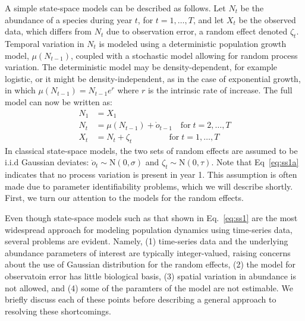 \documentclass[12pt]{article}
\begin{document}
A simple state-space models can be described as follows.
Let $N_t$ be the abundance of a species during year $t$, for
$t=1,\hdots,T$, and let $X_t$ be
the observed data, which differs from $N_t$ due to observation error,
a random effect denoted $\zeta_t$. Temporal variation in $N_t$ is
modeled using a deterministic population growth model, $\mu(N_{t-1})$,
coupled with a stochastic model allowing
for random process variation. %
The deterministic model may be density-dependent, for example
logistic, or it might be density-independent, as in the case of
exponential growth, in which $\mu(N_{t-1}) = N_{t-1}e^{r}$ where $r$
is the intrinsic rate of increase. The full model can now be written
as:
\begin{subequations}
  \label{eq:ss1}
  \begin{align}
    N_1 &= X_1 \label{eq:ss1a} \\
    N_t &= \mu(N_{t-1}) + \grave{o}_{t-1} \quad \text{for} \; t=2,\hdots,T \label{eq:ss1b} \\
    X_t &= N_t + \zeta_t \qquad \qquad \;\, \text{for} \; t=1,\hdots,T \label{eq:ss1c}
  \end{align}
\end{subequations}
In classical state-space models, the two sets of random effects %
are assumed to be i.i.d Gaussian deviates:
$\grave{o}_t \sim \mathrm{N}(0, \sigma)$ and
$\zeta_t \sim \mathrm{N}(0, \tau)$.
Note that Eq~\ref{eq:ss1a} indicates that no process variation is
present in year 1. This assumption is often made
due to parameter identifiability problems, which we will describe
shortly. First, we turn our attention to the models for the random
effects.

Even though state-space models such as that shown in Eq.~\ref{eq:ss1}
are the most widespread approach for modeling population dynamics
using time-series data, several problems are evident. Namely, (1)
time-series data and the underlying abundance parameters of interest
are typically integer-valued, raising concerns about the use of
Gaussian distribution for the random effects, (2) the model for
observatoin error has little biological basis, (3)
spatial variation in abundance is not allowed, and (4) some of the
paramters of the model are not estimable. We briefly discuss each of
these points before describing a general approach to resolving these
shortcomings.
\end{document}
